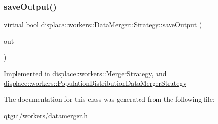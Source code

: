 \subsubsection{\texorpdfstring{saveOutput()}{saveOutput()}}
{\footnotesize\ttfamily virtual bool displace\+::workers\+::\+Data\+Merger\+::\+Strategy\+::save\+Output (\begin{DoxyParamCaption}\item[{Q\+String}]{out }\end{DoxyParamCaption})\hspace{0.3cm}{\ttfamily [pure virtual]}}



Implemented in \mbox{\hyperlink{classdisplace_1_1workers_1_1_merger_strategy_a5e0908a7d6b0a75f4e877711a386d7be}{displace\+::workers\+::\+Merger\+Strategy}}, and \mbox{\hyperlink{classdisplace_1_1workers_1_1_population_distribution_data_merger_strategy_a5fb32f900e449b7740b3ce4618b068c9}{displace\+::workers\+::\+Population\+Distribution\+Data\+Merger\+Strategy}}.



The documentation for this class was generated from the following file\+:\begin{DoxyCompactItemize}
\item 
qtgui/workers/\mbox{\hyperlink{datamerger_8h}{datamerger.\+h}}\end{DoxyCompactItemize}
